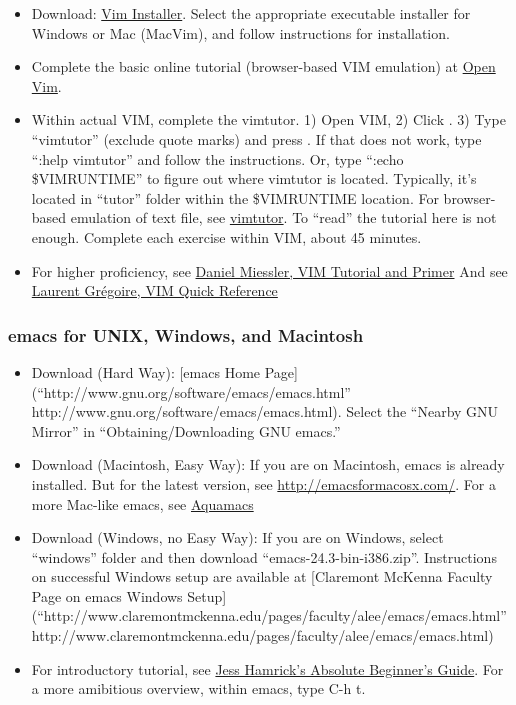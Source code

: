 \documentclass[]{article}
\begin{document}
\begin{itemize}
\itemsep1pt\parskip0pt
\item
  Download: \href{http://www.vim.org/}{Vim Installer}. Select the
  appropriate executable installer for Windows or Mac (MacVim), and
  follow instructions for installation.
\item
  Complete the basic online tutorial (browser-based VIM emulation) at
  \href{http://www.openvim.com/tutorial.html}{Open Vim}.
\item
  Within actual VIM, complete the vimtutor. 1) Open VIM, 2) Click . 3)
  Type ``vimtutor'' (exclude quote marks) and press . If that does not
  work, type ``:help vimtutor'' and follow the instructions. Or, type
  ``:echo \$VIMRUNTIME'' to figure out where vimtutor is located.
  Typically, it's located in ``tutor'' folder within the \$VIMRUNTIME
  location. For browser-based emulation of text file, see
  \href{http://www2.geog.ucl.ac.uk/~plewis/teaching/unix/vimtutor}{vimtutor}.
  To ``read'' the tutorial here is not enough. Complete each exercise
  within VIM, about 45 minutes.
\item
  For higher proficiency, see
  \href{http://www.danielmiessler.com/study/vim/}{Daniel Miessler, VIM
  Tutorial and Primer} And see
  \href{http://tnerual.eriogerg.free.fr/vimqrc.pdf}{Laurent Grégoire,
  VIM Quick Reference}
\end{itemize}

\subsubsection{emacs for UNIX, Windows, and
Macintosh}\label{emacs-for-unix-windows-and-macintosh}

\begin{itemize}
\itemsep1pt\parskip0pt
\item
  Download (Hard Way): {[}emacs Home
  Page{]}(``http://www.gnu.org/software/emacs/emacs.html''
  http://www.gnu.org/software/emacs/emacs.html). Select the ``Nearby GNU
  Mirror'' in ``Obtaining/Downloading GNU emacs.''
\item
  Download (Macintosh, Easy Way): If you are on Macintosh, emacs is
  already installed. But for the latest version, see
  \url{http://emacsformacosx.com/}. For a more Mac-like emacs, see
  \href{http://aquamacs.org/about.shtml}{Aquamacs}
\item
  Download (Windows, no Easy Way): If you are on Windows, select
  ``windows'' folder and then download ``emacs-24.3-bin-i386.zip''.
  Instructions on successful Windows setup are available at {[}Claremont
  McKenna Faculty Page on emacs Windows
  Setup{]}(``http://www.claremontmckenna.edu/pages/faculty/alee/emacs/emacs.html''
  http://www.claremontmckenna.edu/pages/faculty/alee/emacs/emacs.html)
\item
  For introductory tutorial, see
  \href{http://www.jesshamrick.com/2012/09/10/absolute-beginners-guide-to-emacs/}{Jess
  Hamrick's Absolute Beginner's Guide}. For a more amibitious overview,
  within emacs, type C-h t.
\end{itemize}
\end{document}
